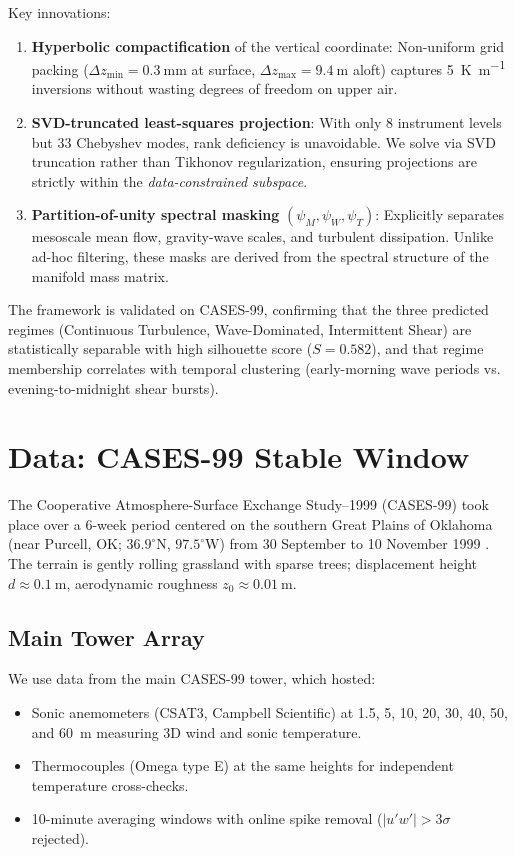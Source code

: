 \documentclass[11pt,a4paper]{article}
\begin{document}
Key innovations:
\begin{enumerate}
  \item \textbf{Hyperbolic compactification} of the vertical coordinate: Non-uniform grid packing ($\Delta z_{\min} = \SI{0.3}{\milli\meter}$ at surface, $\Delta z_{\max} = \SI{9.4}{\meter}$ aloft) captures \SI{5}{\kelvin\per\meter} inversions without wasting degrees of freedom on upper air.
  \item \textbf{SVD-truncated least-squares projection}: With only 8 instrument levels but 33 Chebyshev modes, rank deficiency is unavoidable. We solve via SVD truncation rather than Tikhonov regularization, ensuring projections are strictly within the \emph{data-constrained subspace}.
  \item \textbf{Partition-of-unity spectral masking} $(\psi_M, \psi_W, \psi_T)$: Explicitly separates mesoscale mean flow, gravity-wave scales, and turbulent dissipation. Unlike ad-hoc filtering, these masks are derived from the spectral structure of the manifold mass matrix.
\end{enumerate}

The framework is validated on CASES-99, confirming that the three predicted regimes (Continuous Turbulence, Wave-Dominated, Intermittent Shear) are statistically separable with high silhouette score ($S = 0.582$), and that regime membership correlates with temporal clustering (early-morning wave periods vs. evening-to-midnight shear bursts).

\section{Data: CASES-99 Stable Window}
\label{sec:data}

The Cooperative Atmosphere-Surface Exchange Study--1999 (CASES-99) took place over a 6-week period centered on the southern Great Plains of Oklahoma (near Purcell, OK; $36.9^\circ$N, $97.5^\circ$W) from 30 September to 10 November 1999 \citep{Poulos2002}. The terrain is gently rolling grassland with sparse trees; displacement height $d \approx \SI{0.1}{\meter}$, aerodynamic roughness $z_0 \approx \SI{0.01}{\meter}$.

\subsection{Main Tower Array}

We use data from the main CASES-99 tower, which hosted:
\begin{itemize}
  \item Sonic anemometers (CSAT3, Campbell Scientific) at 1.5, 5, 10, 20, 30, 40, 50, and \SI{60}{\meter} measuring 3D wind and sonic temperature.
  \item Thermocouples (Omega type E) at the same heights for independent temperature cross-checks.
  \item 10-minute averaging windows with online spike removal ($|u'w'| > 3 \sigma$ rejected).
\end{itemize}
\end{document}
